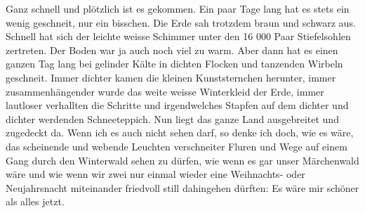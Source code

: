 \def\day{12. November 1942 *}
\mktitle

Ganz schnell und pl\"{o}tzlich ist es gekommen.
Ein paar Tage lang hat es stets ein wenig geschneit, nur ein bisschen.
Die Erde sah trotzdem braun und schwarz aus.
Schnell hat sich der leichte weisse Schimmer unter den 16 000 Paar Stiefelsohlen zertreten.
Der Boden war ja auch noch viel zu warm.
Aber dann hat es einen ganzen Tag lang bei gelinder K\"{a}lte in dichten Flocken und tanzenden Wirbeln geschneit.
Immer dichter kamen die kleinen Kunststernchen herunter, immer zusammenh\"{a}ngender wurde das weite weisse Winterkleid der Erde, immer lautloser verhallten die Schritte und irgendwelches Stapfen auf dem dichter und dichter werdenden Schneeteppich.
Nun liegt das ganze Land ausgebreitet und zugedeckt da.
Wenn ich es auch nicht sehen darf, so denke ich doch, wie es w\"{a}re, das scheinende und webende Leuchten verschneiter Fluren und Wege auf einem Gang durch den Winterwald sehen zu d\"{u}rfen, wie wenn es gar unser M\"{a}rchenwald w\"{a}re und wie wenn wir zwei nur einmal wieder eine Weihnachts- oder Neujahrsnacht miteinander friedvoll still dahingehen d\"{u}rften: Es w\"{a}re mir sch\"{o}ner als alles jetzt.

\clearpage
